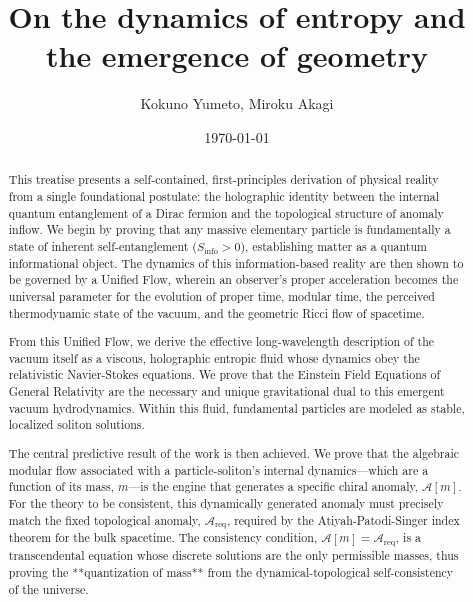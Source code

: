 \documentclass[11pt, letterpaper]{report}
\theoremstyle{plain} %
\theoremstyle{definition} %
\theoremstyle{remark} %
\begin{document}
\title{\textbf{On the dynamics of entropy and the emergence of geometry}}
\author{Kokuno Yumeto,  Miroku Akagi}
\date{\today}
\maketitle



\begin{abstract}
This treatise presents a self-contained, first-principles derivation of physical reality from a single foundational postulate: the holographic identity between the internal quantum entanglement of a Dirac fermion and the topological structure of anomaly inflow. We begin by proving that any massive elementary particle is fundamentally a state of inherent self-entanglement ($S_{\text{info}}>0$), establishing matter as a quantum informational object. The dynamics of this information-based reality are then shown to be governed by a Unified Flow, wherein an observer's proper acceleration becomes the universal parameter for the evolution of proper time, modular time, the perceived thermodynamic state of the vacuum, and the geometric Ricci flow of spacetime.

From this Unified Flow, we derive the effective long-wavelength description of the vacuum itself as a viscous, holographic entropic fluid whose dynamics obey the relativistic Navier-Stokes equations. We prove that the Einstein Field Equations of General Relativity are the necessary and unique gravitational dual to this emergent vacuum hydrodynamics. Within this fluid, fundamental particles are modeled as stable, localized soliton solutions.

The central predictive result of the work is then achieved. We prove that the algebraic modular flow associated with a particle-soliton's internal dynamics—which are a function of its mass, $m$—is the engine that generates a specific chiral anomaly, $\mathcal{A}[m]$. For the theory to be consistent, this dynamically generated anomaly must precisely match the fixed topological anomaly, $\mathcal{A}_{\text{req}}$, required by the Atiyah-Patodi-Singer index theorem for the bulk spacetime. The consistency condition, $\mathcal{A}[m] = \mathcal{A}_{\text{req}}$, is a transcendental equation whose discrete solutions are the only permissible masses, thus proving the **quantization of mass** from the dynamical-topological self-consistency of the universe.


\end{abstract}
\end{document}
